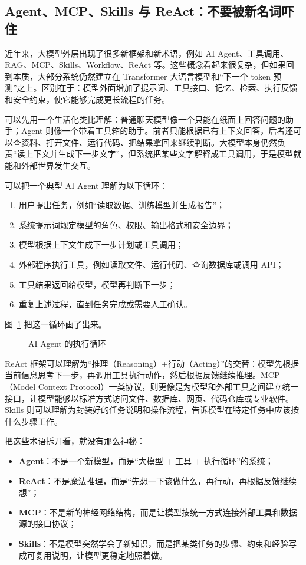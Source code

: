 \subsection{Agent、MCP、Skills 与 ReAct：不要被新名词吓住}

近年来，大模型外层出现了很多新框架和新术语，例如 AI Agent、工具调用、RAG、MCP、Skills、Workflow、ReAct 等。这些概念看起来很复杂，但如果回到本质，大部分系统仍然建立在 Transformer 大语言模型和“下一个 token 预测”之上。区别在于：模型外面增加了提示词、工具接口、记忆、检索、执行反馈和安全约束，使它能够完成更长流程的任务。

可以先用一个生活化类比理解：普通聊天模型像一个只能在纸面上回答问题的助手；Agent 则像一个带着工具箱的助手。前者只能根据已有上下文回答，后者还可以查资料、打开文件、运行代码、把结果拿回来继续判断。大模型本身仍然负责“读上下文并生成下一步文字”，但系统把某些文字解释成工具调用，于是模型就能和外部世界发生交互。

可以把一个典型 AI Agent 理解为以下循环：

\begin{enumerate}
    \item 用户提出任务，例如“读取数据、训练模型并生成报告”；
    \item 系统提示词规定模型的角色、权限、输出格式和安全边界；
    \item 模型根据上下文生成下一步计划或工具调用；
    \item 外部程序执行工具，例如读取文件、运行代码、查询数据库或调用 API；
    \item 工具结果返回给模型，模型再判断下一步；
    \item 重复上述过程，直到任务完成或需要人工确认。
\end{enumerate}

图~\ref{fig:ch11_agent} 把这一循环画了出来。

\begin{figure}[H]
  \centering
  \caption{AI Agent 的执行循环}
  \label{fig:ch11_agent}
\end{figure}

ReAct 框架可以理解为“推理（Reasoning）+行动（Acting）”的交替：模型先根据当前信息思考下一步，再调用工具执行动作，然后根据反馈继续推理。MCP（Model Context Protocol）一类协议，则更像是为模型和外部工具之间建立统一接口，让模型能够以标准方式访问文件、数据库、网页、代码仓库或专业软件。Skills 则可以理解为封装好的任务说明和操作流程，告诉模型在特定任务中应该按什么步骤工作。

把这些术语拆开看，就没有那么神秘：
\begin{itemize}
    \item \textbf{Agent}：不是一个新模型，而是“大模型 + 工具 + 执行循环”的系统；
    \item \textbf{ReAct}：不是魔法推理，而是“先想一下该做什么，再行动，再根据反馈继续想”；
    \item \textbf{MCP}：不是新的神经网络结构，而是让模型按统一方式连接外部工具和数据源的接口协议；
    \item \textbf{Skills}：不是模型突然学会了新知识，而是把某类任务的步骤、约束和经验写成可复用说明，让模型更稳定地照着做。
\end{itemize}

